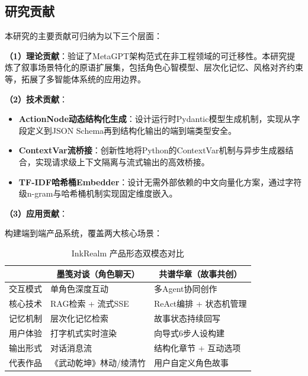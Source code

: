 \documentclass[UTF8,oneside,a4paper]{ctexart}
\begin{document}
\subsection{研究贡献}
\label{sec:contributions}

本研究的主要贡献可归纳为以下三个层面：

\textbf{（1）理论贡献}：验证了MetaGPT架构范式在非工程领域的可迁移性。本研究提炼了叙事场景特化的原语扩展集，包括角色心智模型、层次化记忆、风格对齐约束等，拓展了多智能体系统的应用边界。

\textbf{（2）技术贡献}：

\begin{itemize}[leftmargin=2em]
\item \textbf{ActionNode动态结构化生成}：设计运行时Pydantic模型生成机制，实现从字段定义到JSON Schema再到结构化输出的端到端类型安全。
\item \textbf{ContextVar流桥接}：创新性地将Python的ContextVar机制与异步生成器结合，实现请求级上下文隔离与流式输出的高效桥接。
\item \textbf{TF-IDF哈希桶Embedder}：设计无需外部依赖的中文向量化方案，通过字符级n-gram与哈希桶机制实现固定维度嵌入。
\end{itemize}

\textbf{（3）应用贡献}：

构建端到端产品系统，覆盖两大核心场景：

\begin{table}[H]
\centering
\caption{InkRealm 产品形态双模态对比}
\label{tab:product-modes}
\renewcommand{\arraystretch}{1.4}
\begin{tabular}{p{3cm}p{5cm}p{5cm}}
\toprule
\rowcolor{tableheader}
\multicolumn{1}{c}{\color{white}\textbf{特性维度}} & \multicolumn{1}{c}{\color{white}\textbf{墨笺对谈（角色聊天）}} & \multicolumn{1}{c}{\color{white}\textbf{共谱华章（故事共创）}} \\
\midrule
交互模式 & 单角色深度互动 & 多Agent协同创作 \\
核心技术 & RAG检索 + 流式SSE & ReAct编排 + 状态机管理 \\
记忆机制 & 层次化记忆检索 & 故事状态持续回写 \\
用户体验 & 打字机式实时渲染 & 向导式6步人设构建 \\
输出形式 & 对话消息流 & 结构化章节 + 互动选项 \\
代表作品 & 《武动乾坤》林动/绫清竹 & 用户自定义角色故事 \\
\bottomrule
\end{tabular}
\end{table}
\end{document}
